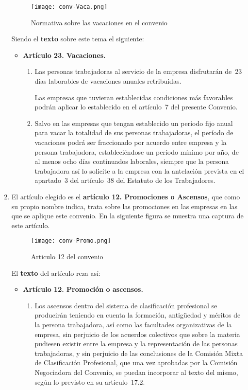 \begin{enumerate}
    \begin{figure}[H]
        \centering
        \texttt{[image: conv-Vaca.png]}
        \caption{Normativa sobre las vacaciones en el convenio}
    \end{figure}

    Siendo el \textbf{texto} sobre este tema el siguiente:

    \begin{itemize}
        \item \textbf{Artículo 23. Vacaciones.}
        \begin{enumerate}
            \item Las personas trabajadoras al servicio de la empresa disfrutarán de 23 días laborables de vacaciones anuales retribuidas.

            Las empresas que tuvieran establecidas condiciones más favorables podrán aplicar lo establecido en el artículo 7 del presente Convenio.

            \item Salvo en las empresas que tengan establecido un período fijo anual para vacar la totalidad de sus personas trabajadoras, el período de vacaciones podrá ser fraccionado por acuerdo entre empresa y la persona trabajadora, estableciéndose un período mínimo por año, de al menos ocho días continuados laborales, siempre que la persona trabajadora así lo solicite a la empresa con la antelación prevista en el apartado 3 del artículo 38 del Estatuto de los Trabajadores.
        \end{enumerate}
    \end{itemize}

    \item El artículo elegido es el \textbf{artículo 12. Promociones o Ascensos}, que como su propio nombre indica, trata sobre las promociones en las empresas en las que se aplique este convenio. En la siguiente figura se muestra una captura de este artículo.

    \begin{figure}[ht]
        \centering
        \texttt{[image: conv-Promo.png]}
        \caption{Articulo 12 del convenio}
    \end{figure}

    El \textbf{texto} del artículo reza así:

    \begin{itemize}
        \item \textbf{Artículo 12. Promoción o ascensos.}
        \begin{enumerate}
            \item Los ascensos dentro del sistema de clasificación profesional se producirán teniendo en cuenta la formación, antigüedad y méritos de la persona trabajadora, así como las facultades organizativas de la empresa, sin perjuicio de los acuerdos colectivos que sobre la materia pudiesen existir entre la empresa y la representación de las personas trabajadoras, y sin perjuicio de las conclusiones de la Comisión Mixta de Clasificación Profesional, que una vez aprobadas por la Comisión Negociadora del Convenio, se puedan incorporar al texto del mismo, según lo previsto en su artículo 17.2.


\end{enumerate}
\end{itemize}
\end{enumerate}
